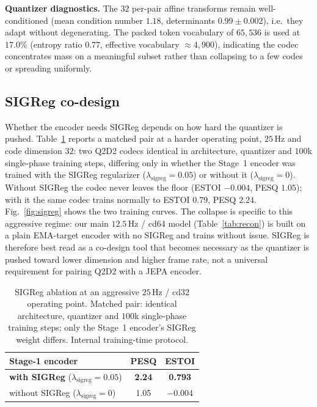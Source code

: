 \documentclass[conference,a4paper]{APSIPA2026}
\begin{document}
\textbf{Quantizer diagnostics.} The $32$ per-pair affine transforms remain
well-conditioned (mean condition number $1.18$, determinants $0.99\pm0.002$),
i.e.\ they adapt without degenerating. The packed token vocabulary of $65{,}536$
is used at $17.0\%$ (entropy ratio $0.77$, effective vocabulary $\approx4{,}900$),
indicating the codec concentrates mass on a meaningful subset rather than
collapsing to a few codes or spreading uniformly.

\subsection{SIGReg co-design}
\label{sec:sigreg}

Whether the encoder needs SIGReg depends on how hard the quantizer is pushed.
Table~\ref{tab:sigreg} reports a matched pair at a harder operating point,
$25$\,Hz and code dimension $32$: two Q2D2 codecs identical in architecture,
quantizer and $100$k single-phase training steps, differing only in whether the
Stage~1 encoder was trained with the SIGReg regularizer
($\lambda_{\mathrm{sigreg}}{=}0.05$) or without it
($\lambda_{\mathrm{sigreg}}{=}0$). Without SIGReg the codec never leaves the
floor (ESTOI $-0.004$, PESQ $1.05$); with it the same codec trains normally to
ESTOI $0.79$, PESQ $2.24$. Fig.~\ref{fig:sigreg} shows the two training curves.
The collapse is specific to this aggressive regime: our main $12.5$\,Hz / cd64
model (Table~\ref{tab:recon}) is built on a plain EMA-target encoder with no
SIGReg and trains without issue. SIGReg is therefore best read as a co-design
tool that becomes necessary as the quantizer is pushed toward lower dimension
and higher frame rate, not a universal requirement for pairing Q2D2 with a JEPA
encoder.

\begin{table}[t]
\caption{SIGReg ablation at an aggressive $25$\,Hz / cd32 operating point.
Matched pair: identical architecture, quantizer and $100$k single-phase
training steps; only the Stage~1 encoder's SIGReg weight differs. Internal
training-time protocol.}
\label{tab:sigreg}
\centering
\begin{tabular}{lcc}
\toprule
Stage-1 encoder & PESQ & ESTOI \\
\midrule
\textbf{with SIGReg} ($\lambda_{\mathrm{sigreg}}{=}0.05$) & \textbf{2.24} & \textbf{0.793} \\
without SIGReg ($\lambda_{\mathrm{sigreg}}{=}0$) & 1.05 & $-0.004$ \\
\bottomrule
\end{tabular}
\end{table}
\end{document}

